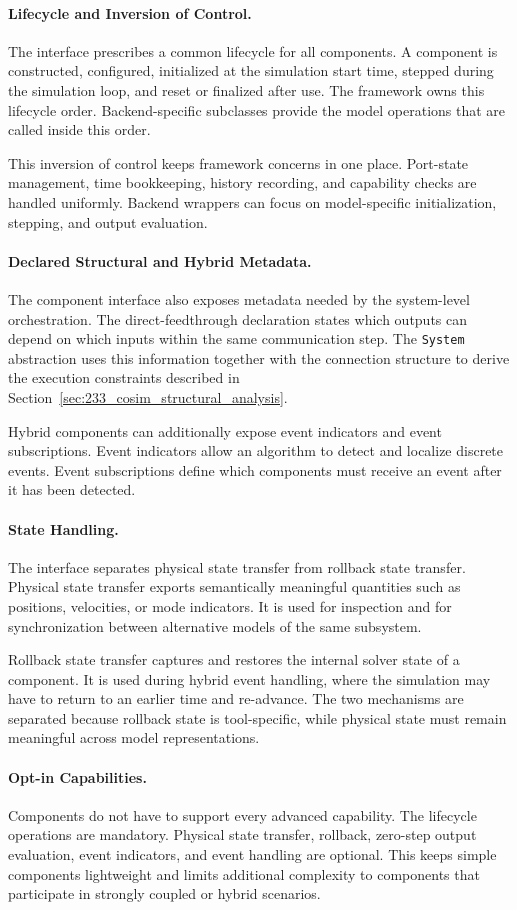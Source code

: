 \paragraph{Lifecycle and Inversion of Control.}
The interface prescribes a common lifecycle for all components.
A component is constructed, configured, initialized at the simulation start time, stepped during the simulation loop, and reset or finalized after use.
The framework owns this lifecycle order.
Backend-specific subclasses provide the model operations that are called inside this order.

This inversion of control keeps framework concerns in one place.
Port-state management, time bookkeeping, history recording, and capability checks are handled uniformly.
Backend wrappers can focus on model-specific initialization, stepping, and output evaluation.

\paragraph{Declared Structural and Hybrid Metadata.}
The component interface also exposes metadata needed by the system-level orchestration.
The direct-feedthrough declaration states which outputs can depend on which inputs within the same communication step.
The \texttt{System} abstraction uses this information together with the connection structure to derive the execution constraints described in Section~\ref{sec:233_cosim_structural_analysis}.

Hybrid components can additionally expose event indicators and event subscriptions.
Event indicators allow an algorithm to detect and localize discrete events.
Event subscriptions define which components must receive an event after it has been detected.

\paragraph{State Handling.}
The interface separates physical state transfer from rollback state transfer.
Physical state transfer exports semantically meaningful quantities such as positions, velocities, or mode indicators.
It is used for inspection and for synchronization between alternative models of the same subsystem.

Rollback state transfer captures and restores the internal solver state of a component.
It is used during hybrid event handling, where the simulation may have to return to an earlier time and re-advance.
The two mechanisms are separated because rollback state is tool-specific, while physical state must remain meaningful across model representations.

\paragraph{Opt-in Capabilities.}
Components do not have to support every advanced capability.
The lifecycle operations are mandatory.
Physical state transfer, rollback, zero-step output evaluation, event indicators, and event handling are optional.
This keeps simple components lightweight and limits additional complexity to components that participate in strongly coupled or hybrid scenarios.